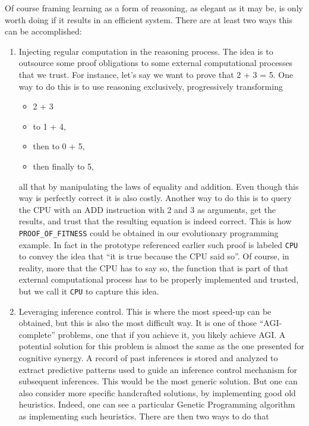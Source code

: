 \documentclass[]{report}
\begin{document}
Of course framing learning as a form of reasoning, as elegant as it
may be, is only worth doing if it results in an efficient system.
There are at least two ways this can be accomplished:
\begin{enumerate}
\item Injecting regular computation in the reasoning process.  The idea
is to outsource some proof obligations to some external computational
processes that we trust.  For instance, let's say we want to prove
that 2 + 3 = 5.  One way to do this is to use reasoning exclusively,
progressively transforming
\begin{itemize}
\item 2 + 3
\item to 1 + 4,
\item then to 0 + 5,
\item then finally to 5,
\end{itemize}
all that by manipulating the laws of equality and addition.  Even
though this way is perfectly correct it is also costly.  Another way
to do this is to query the CPU with an ADD instruction with 2 and 3 as
arguments, get the results, and trust that the resulting equation is
indeed correct.  This is how \texttt{PROOF_OF_FITNESS}
could be obtained in our evolutionary programming example.  In fact in
the prototype referenced earlier such proof is labeled
\texttt{CPU} to convey the idea that ``it is true because
the CPU said so''.  Of course, in reality, more that the CPU has to
say so, the function that is part of that external computational
process has to be properly implemented and trusted, but we call it
\texttt{CPU} to capture this idea.
\item Leveraging inference control.  This is where the most speed-up can
   be obtained, but this is also the most difficult way.  It is one of
   those ``AGI-complete'' problems, one that if you achieve it, you
   likely achieve AGI.  A potential solution for this problem is
   almost the same as the one presented for cognitive synergy.  A
   record of past inferences is stored and analyzed to extract
   predictive patterns used to guide an inference control mechanism
   for subsequent inferences.  This would be the most generic
   solution.  But one can also consider more specific handcrafted
   solutions, by implementing good old heuristics.  Indeed, one can
   see a particular Genetic Programming algorithm as implementing such
   heuristics.  There are then two ways to do that
   \begin{enumerate}

\end{enumerate}
\end{enumerate}
\end{document}
